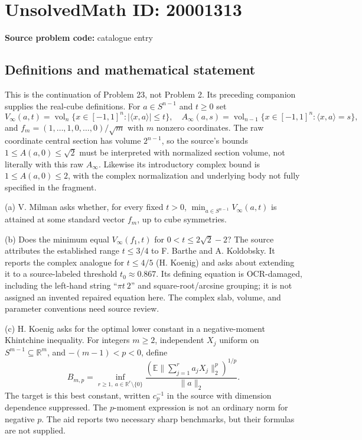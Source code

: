 \documentclass[11pt]{article}
\newcommand{\R}{\mathbb{R}}
\newcommand{\E}{\mathbb{E}}
\begin{document}
\section*{UnsolvedMath ID: 20001313}
\textbf{Source problem code:} catalogue entry
\subsection{Definitions and mathematical statement}
This is the continuation of Problem 23, not Problem 2. Its preceding companion supplies the real-cube definitions. For $a\in S^{n-1}$ and $t\geq0$ set
\[
 V_\infty(a,t)=\operatorname{vol}_n\{x\in[-1,1]^n:|\langle x,a\rangle|\leq t\},\quad
 A_\infty(a,s)=\operatorname{vol}_{n-1}\{x\in[-1,1]^n:\langle x,a\rangle=s\},
\]
and $f_m=(1,\ldots,1,0,\ldots,0)/\sqrt m$ with $m$ nonzero coordinates. The raw coordinate central section has volume $2^{n-1}$, so the source's bounds $1\leq A(a,0)\leq\sqrt2$ must be interpreted with normalized section volume, not literally with this raw $A_\infty$. Likewise its introductory complex bound is $1\leq A(a,0)\leq2$, with the complex normalization and underlying body not fully specified in the fragment.

(a) V. Milman asks whether, for every fixed $t>0$, $\min_{a\in S^{n-1}}V_\infty(a,t)$ is attained at some standard vector $f_m$, up to cube symmetries.

(b) Does the minimum equal $V_\infty(f_1,t)$ for $0<t\leq2\sqrt2-2$? The source attributes the established range $t\leq3/4$ to F. Barthe and A. Koldobsky. It reports the complex analogue for $t\leq4/5$ (H. Koenig) and asks about extending it to a source-labeled threshold $t_0\approx0.867$. Its defining equation is OCR-damaged, including the left-hand string ``$\pi t\ 2$'' and square-root/arcsine grouping; it is not assigned an invented repaired equation here. The complex slab, volume, and parameter conventions need source review.

(c) H. Koenig asks for the optimal lower constant in a negative-moment Khintchine inequality. For integers $m\geq2$, independent $X_j$ uniform on $S^{m-1}\subseteq\R^m$, and $-(m-1)<p<0$, define
\[
 B_{m,p}=\inf_{r\geq1,\ a\in\R^r\setminus\{0\}}
 \frac{(\E\|\sum_{j=1}^r a_jX_j\|_2^p)^{1/p}}{\|a\|_2}.
\]
The target is this best constant, written $c_p^{-1}$ in the source with dimension dependence suppressed. The $p$-moment expression is not an ordinary norm for negative $p$. The aid reports two necessary sharp benchmarks, but their formulas are not supplied.
\end{document}

